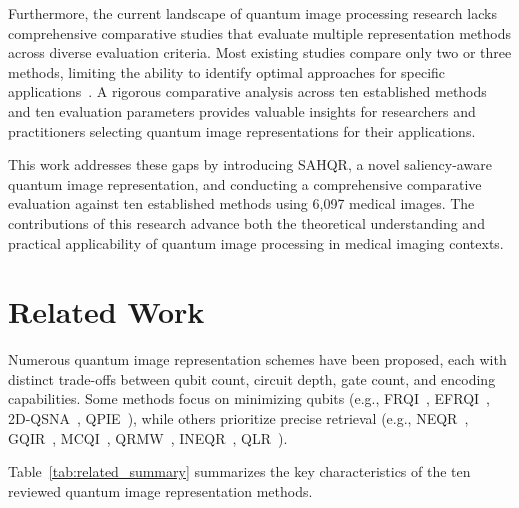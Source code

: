 \documentclass{ipol}
\begin{document}
Furthermore, the current landscape of quantum image processing research lacks comprehensive comparative studies that evaluate multiple representation methods across diverse evaluation criteria. Most existing studies compare only two or three methods, limiting the ability to identify optimal approaches for specific applications~\cite{bib42}. A rigorous comparative analysis across ten established methods and ten evaluation parameters provides valuable insights for researchers and practitioners selecting quantum image representations for their applications.

This work addresses these gaps by introducing SAHQR, a novel saliency-aware quantum image representation, and conducting a comprehensive comparative evaluation against ten established methods using 6,097 medical images. The contributions of this research advance both the theoretical understanding and practical applicability of quantum image processing in medical imaging contexts.




\section{Related Work}\label{sec:related}

Numerous quantum image representation schemes have been proposed, each with distinct trade-offs between qubit count, circuit depth, gate count, and encoding capabilities. Some methods focus on minimizing qubits (e.g., FRQI~\cite{bib18}, EFRQI~\cite{bib50,bib51}, 2D-QSNA~\cite{bib52,bib53}, QPIE~\cite{bib56,bib57}), while others prioritize precise retrieval (e.g., NEQR~\cite{bib19}, GQIR~\cite{bib46,bib15}, MCQI~\cite{bib47,bib13}, QRMW~\cite{bib48,bib49}, INEQR~\cite{bib54,bib55}, QLR~\cite{bib58,bib49}).

Table~\ref{tab:related_summary} summarizes the key characteristics of the ten reviewed quantum image representation methods.
\end{document}
